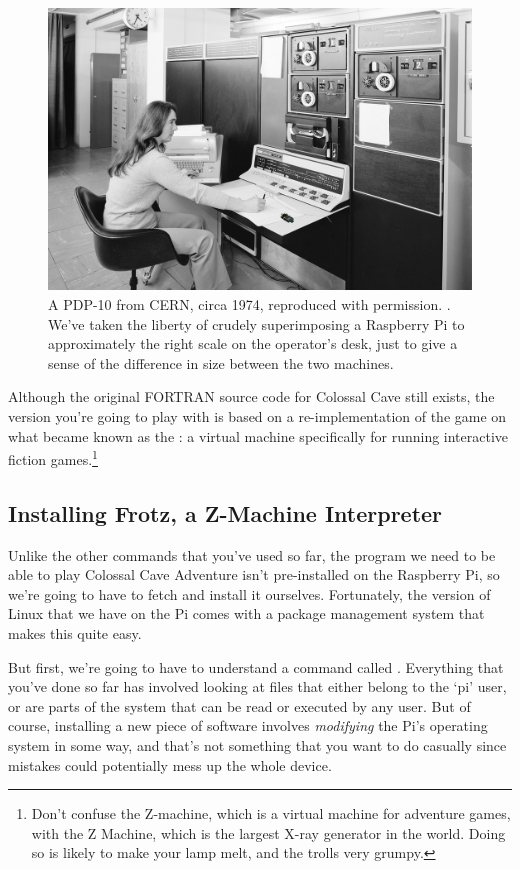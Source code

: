 \begin{figure}[t]
\centerline{\includegraphics[width=14cm]{images/cern-pdp10+pi.png}}
\caption{A PDP-10 from CERN, circa 1974, reproduced with permission. . We've taken the liberty of crudely superimposing a Raspberry Pi to approximately the right scale on the operator's desk, just to give a sense of the difference in size between the two machines.}\label{figure:cern-pdp-10}
\end{figure}

Although the original FORTRAN source code for Colossal Cave still exists, the version you're going to play with is based on a re-implementation of the game on what became known as the : a virtual machine specifically for running interactive fiction games.\footnote{Don't confuse the Z-machine, which is a virtual machine for adventure games, with the Z Machine, which is the largest X-ray generator in the world. Doing so is likely to make your lamp melt, and the trolls very grumpy.}
 
\FloatBarrier
\subsection{Installing Frotz, a Z-Machine Interpreter}

Unlike the other commands that you've used so far, the program we need to be able to play Colossal Cave Adventure isn't pre-installed on the Raspberry Pi, so we're going to have to fetch and install it ourselves. Fortunately, the version of Linux that we have on the Pi comes with a package management system that makes this quite easy. 

But first, we're going to have to understand a command called . Everything that you've done so far has involved looking at files that either belong to the `pi' user, or are parts of the system that can be read or executed by any user. But of course, installing a new piece of software involves \textit{modifying} the Pi's operating system in some way, and that's not something that you want to do casually since mistakes could potentially mess up the whole device. 

